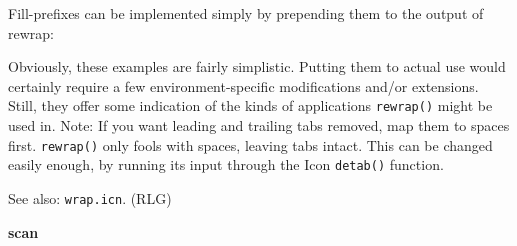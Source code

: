 
Fill-prefixes can be implemented simply by prepending them to the output
of rewrap:



Obviously, these examples are fairly simplistic. Putting them to actual
use would certainly require a few environment-specific modifications
and/or extensions. Still, they offer some indication of the kinds of
applications \texttt{rewrap()} might be used in. Note: If you want
leading and trailing tabs removed, map them to spaces first.
\texttt{rewrap()} only fools with spaces, leaving tabs intact. This can
be changed easily enough, by running its input through the Icon
\texttt{detab()} function.

See also: \texttt{wrap.icn}. (RLG)

{\sffamily\bfseries
scan}


